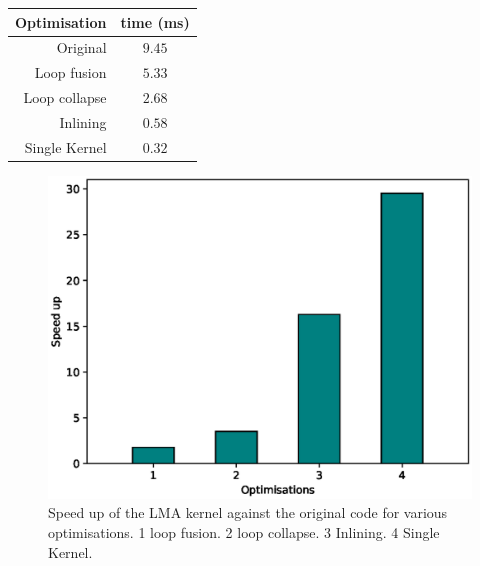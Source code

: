 \begin{table}
\centering
\begin{tabular}{rc}
Optimisation & time (ms) \\\hline
Original     & $9.45$ \\
Loop fusion  & $5.33$ \\
Loop collapse & $2.68$ \\ 
Inlining      & $0.58$ \\
Single Kernel & $0.32$ \\\hline
\end{tabular}
\end{table}

\begin{figure}
\centering\includegraphics[width=1.0\linewidth]{figs/LMA-nvidia.eps}
\caption{\label{fig:lma_nvidia}Speed up of the LMA kernel against the
  original code for various optimisations. 1 loop fusion. 2 loop
  collapse. 3 Inlining. 4 Single Kernel.}
\end{figure} 




